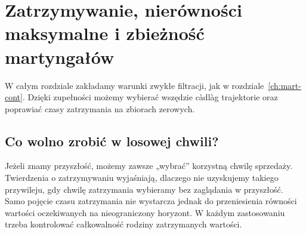 \chapter{Zatrzymywanie, nierówności maksymalne i zbieżność martyngałów}
\label{ch:stop-cont}

W całym rozdziale zakładamy warunki zwykłe filtracji,
jak w rozdziale~\ref{ch:mart-cont}. Dzięki zupełności
możemy wybierać wszędzie c\`adl\`ag trajektorie
oraz poprawiać czasy zatrzymania na zbiorach zerowych.

\section{Co wolno zrobić w losowej chwili?}
Jeżeli znamy przyszłość, możemy zawsze „wybrać” korzystną
chwilę sprzedaży. Twierdzenia o zatrzymywaniu wyjaśniają,
dlaczego nie uzyskujemy takiego przywileju, gdy chwilę
zatrzymania wybieramy bez zaglądania w przyszłość.
Samo pojęcie czasu zatrzymania nie wystarcza jednak do
przeniesienia równości wartości oczekiwanych na nieograniczony
horyzont. W każdym zastosowaniu trzeba kontrolować
całkowalność rodziny zatrzymanych wartości.

